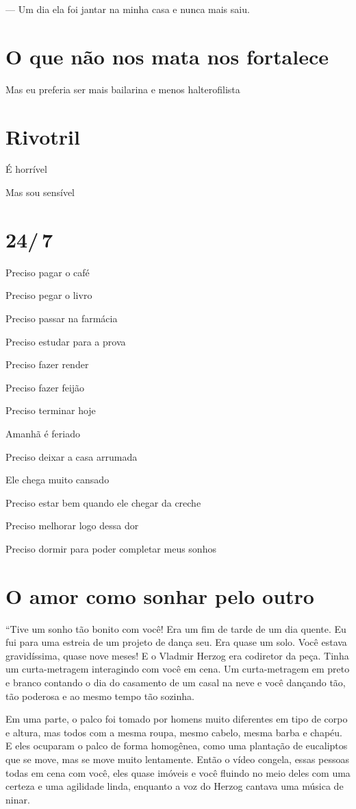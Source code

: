 {{{--- Um dia ela foi jantar na minha casa e nunca mais saiu.

\chapter{O que não nos mata nos fortalece}

Mas eu preferia ser mais bailarina e menos halterofilista


\chapter{Rivotril}

É horrível

Mas sou sensível

\chapter{24/\,7}

Preciso pagar o café

Preciso pegar o livro

Preciso passar na farmácia

Preciso estudar para a prova

Preciso fazer render

Preciso fazer feijão

Preciso terminar hoje

Amanhã é feriado

Preciso deixar a casa arrumada

Ele chega muito cansado

Preciso estar bem quando ele chegar da creche

Preciso melhorar logo dessa dor

Preciso dormir para poder completar meus sonhos
}
\chapter{O amor como sonhar pelo outro}

``Tive um sonho tão bonito com você! Era um fim de tarde de um dia
quente. Eu fui para uma estreia de um projeto de dança seu. Era quase um
solo. Você estava gravidíssima, quase nove meses! E o Vladmir Herzog era
codiretor da peça. Tinha um curta-metragem interagindo com você em cena.
Um curta-metragem em preto e branco contando o dia do casamento de um
casal na neve e você dançando tão, tão poderosa e ao mesmo tempo tão
sozinha.

Em uma parte, o palco foi tomado por homens muito diferentes em tipo de
corpo e altura, mas todos com a mesma roupa, mesmo cabelo, mesma barba e
chapéu. E eles ocuparam o palco de forma homogênea, como uma plantação
de eucaliptos que se move, mas se move muito lentamente. Então o vídeo
congela, essas pessoas todas em cena com você, eles quase imóveis e você
fluindo no meio deles com uma certeza e uma agilidade linda, enquanto a
voz do Herzog cantava uma música de ninar.

}}
